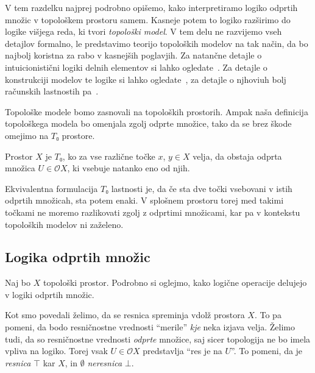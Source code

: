 
V tem razdelku najprej podrobno opišemo, kako interpretiramo logiko odprtih
množic v topološkem prostoru samem. Kasneje potem to logiko razširimo do logike
višjega reda, ki tvori \emph{topološki model}. V tem delu ne razvijemo vseh
detajlov formalno, le predstavimo teorijo topoloških modelov na tak način, da bo
najbolj koristna za rabo v kasnejših poglavjih. Za natančne detajle o
intuicionistični logiki delnih elementov si lahko ogledate~\cite{Scott79}. Za
detajle o konstrukciji modelov te logike si lahko ogledate~\cite{FS79}, za
detajle o njhoviuh bolj računskih lastnostih pa~\cite[pogl.~2.6-2.8]{Borceux94}.

Topološke modele bomo zasnovali na topoloških prostorih. Ampak naša definicija
topološkega modela bo omenjala zgolj odprte množice, tako da se brez škode
omejimo na \(T₀\) prostore.
\begin{definicija}
  Prostor \(X\) je \(T₀\), ko za vse različne točke \(x\), \(y ∈ X\) velja, da
  obstaja odprta množica \(U ∈ 𝒪X\), ki vsebuje natanko eno od njih.
\end{definicija}
Ekvivalentna formulacija \(T₀\) lastnosti je, da če sta dve točki vsebovani
v istih odprtih množicah, sta potem enaki. V splošnem prostoru torej med takimi
točkami ne moremo razlikovati zgolj z odprtimi množicami, kar pa v kontekstu
topoloških modelov ni zaželeno.


\subsection{Logika odprtih množic}\label{sec:modeli-logika-odprtih}

Naj bo \(X\) topološki prostor. Podrobno si oglejmo, kako logične operacije
delujejo v logiki odprtih množic.

Kot smo povedali želimo, da se resnica spreminja vdolž prostora \(X\). To pa
pomeni, da bodo resničnostne vrednosti ``merile'' \emph{kje} neka izjava velja.
Želimo tudi, da so resničnostne vrednosti \emph{odprte} množice, saj sicer
topologija ne bo imela vpliva na logiko. Torej vsak \(U ∈ 𝒪X\) predstavlja ``res
je na \(U\)''. To pomeni, da je \emph{resnica} \(⊤\) kar \(X\), in \(∅\)
\emph{neresnica} \(⊥\).

